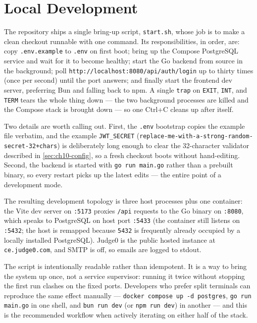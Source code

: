 \section{Local Development}

The repository ships a single bring-up script, \texttt{start.sh}, whose job is to make a clean checkout runnable with one command. Its responsibilities, in order, are: copy \texttt{.env.example} to \texttt{.env} on first boot; bring up the Compose PostgreSQL service and wait for it to become healthy; start the Go backend from source in the background; poll \texttt{http://localhost:8080/api/auth/login} up to thirty times (once per second) until the port answers; and finally start the frontend dev server, preferring Bun and falling back to npm. A single \texttt{trap} on \texttt{EXIT}, \texttt{INT}, and \texttt{TERM} tears the whole thing down --- the two background processes are killed and the Compose stack is brought down --- so one Ctrl+C cleans up after itself.

Two details are worth calling out. First, the \texttt{.env} bootstrap copies the example file verbatim, and the example \texttt{JWT\_SECRET} (\texttt{replace-me-with-a-strong-random-secret-32+chars}) is deliberately long enough to clear the 32-character validator described in \cref{sec:ch10-config}, so a fresh checkout boots without hand-editing. Second, the backend is started with \texttt{go run main.go} rather than a prebuilt binary, so every restart picks up the latest edits --- the entire point of a development mode.

The resulting development topology is three host processes plus one container: the Vite dev server on \texttt{:5173} proxies \texttt{/api} requests to the Go binary on \texttt{:8080}, which speaks to PostgreSQL on host port \texttt{:5433} (the container still listens on \texttt{:5432}; the host is remapped because \texttt{5432} is frequently already occupied by a locally installed PostgreSQL). Judge0 is the public hosted instance at \texttt{ce.judge0.com}, and SMTP is off, so emails are logged to stdout.

The script is intentionally readable rather than idempotent. It is a way to bring the system up once, not a service supervisor: running it twice without stopping the first run clashes on the fixed ports. Developers who prefer split terminals can reproduce the same effect manually --- \texttt{docker compose up -d postgres}, \texttt{go run main.go} in one shell, and \texttt{bun run dev} (or \texttt{npm run dev}) in another --- and this is the recommended workflow when actively iterating on either half of the stack.

